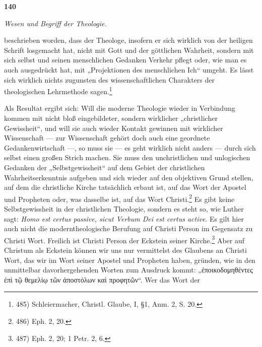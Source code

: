 \pagestyle{empty}
\begin{flushleft}
\begin{minipage}[t]{0.5\textwidth}
\textbf{140}
\end{minipage}%
\begin{minipage}[t]{0.5\textwidth}
\raggedleft
\emph{Wesen und Begriff der Theologie.}
\end{minipage}
\end{flushleft}

beschrieben worden, dass der Theologe, insofern er sich wirklich von der heiligen Schrift losgemacht hat, nicht mit Gott und der göttlichen Wahrheit, sondern mit sich selbst und seinen menschlichen Gedanken Verkehr pflegt oder, wie man es auch ausgedrückt hat, mit „Projektionen des menschlichen Ich“ umgeht. Es lässt sich wirklich nichts zugunsten des wissenschaftlichen Charakters der theologischen Lehrmethode sagen.\footnote{485) Schleiermacher, Christl. Glaube, I, \S 1, Anm. 2, S. 20.}

Als Resultat ergibt sich: Will die moderne Theologie wieder in Verbindung kommen mit nicht bloß eingebildeter, sondern wirklicher „christlicher Gewissheit“, und will sie auch wieder Kontakt gewinnen mit wirklicher Wissenschaft --- zur Wissenschaft gehört doch auch eine geordnete Gedankenwirtschaft ---, so muss sie --- es geht wirklich nicht anders --- durch sich selbst einen großen Strich machen. Sie muss den unchristlichen und unlogischen Gedanken der „Selbstgewissheit“ auf dem Gebiet der christlichen Wahrheitserkenntnis aufgeben und sich wieder auf den objektiven Grund stellen, auf dem die christliche Kirche tatsächlich erbaut ist, auf das Wort der Apostel und Propheten oder, was dasselbe ist, auf das Wort Christi.\footnote{486) Eph. 2, 20.} Es gibt keine Selbstgewissheit in der christlichen Theologie, sondern es steht so, wie Luther sagt: \emph{Homo est certus passive, sicut Verbum Dei est certus active}. Es gilt hier auch nicht die moderntheologische Berufung auf Christi Person im Gegensatz zu Christi Wort. Freilich ist Christi Person der Eckstein seiner Kirche.\footnote{487) Eph. 2, 20; 1 Petr. 2, 6.} Aber auf Christum als Eckstein können wir uns nur vermittelst des Glaubens an Christi Wort, das wir im Wort seiner Apostel und Propheten haben, gründen, wie in den unmittelbar davorhergehenden Worten zum Ausdruck kommt: „\textgreek{ἐποικοδομηθέντες ἐπὶ τῷ θεμελίῳ τῶν ἀποστόλων καὶ προφητῶν}“. Wer das Wort der
